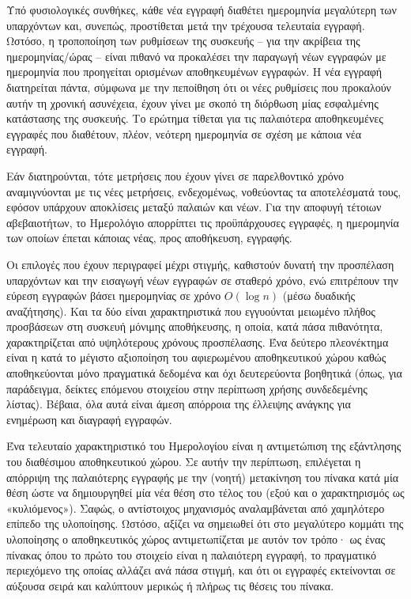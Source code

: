 Υπό φυσιολογικές συνθήκες, κάθε νέα εγγραφή διαθέτει ημερομηνία μεγαλύτερη των
υπαρχόντων και, συνεπώς, προστίθεται μετά την τρέχουσα τελευταία εγγραφή.
Ωστόσο, η τροποποίηση των ρυθμίσεων της συσκευής -- για την ακρίβεια της
ημερομηνίας\slash ώρας --  είναι πιθανό να προκαλέσει την παραγωγή νέων εγγραφών
με ημερομηνία που προηγείται ορισμένων αποθηκευμένων εγγραφών. Η νέα εγγραφή
διατηρείται πάντα, σύμφωνα με την πεποίθηση ότι οι νέες ρυθμίσεις που προκαλούν
αυτήν τη χρονική ασυνέχεια, έχουν γίνει με σκοπό τη διόρθωση μίας εσφαλμένης
κατάστασης της συσκευής. Το ερώτημα τίθεται για τις παλαιότερα αποθηκευμένες
εγγραφές που διαθέτουν, πλέον, νεότερη ημερομηνία σε σχέση με κάποια νέα
εγγραφή.

Εάν διατηρούνται, τότε μετρήσεις που έχουν γίνει σε παρελθοντικό χρόνο
αναμιγνύονται με τις νέες μετρήσεις, ενδεχομένως, νοθεύοντας τα αποτελέσματά
τους, εφόσον υπάρχουν αποκλίσεις μεταξύ παλαιών και νέων. Για την αποφυγή
τέτοιων αβεβαιοτήτων, το Ημερολόγιο απορρίπτει τις προϋπάρχουσες εγγραφές, η
ημερομηνία των οποίων έπεται κάποιας νέας, προς αποθήκευση, εγγραφής.

Οι επιλογές που έχουν περιγραφεί μέχρι στιγμής, καθιστούν δυνατή την προσπέλαση
υπαρχόντων και την εισαγωγή νέων εγγραφών σε σταθερό χρόνο, ενώ επιτρέπουν την
εύρεση εγγραφών βάσει ημερομηνίας σε χρόνο $O(\log n)$ (μέσω δυαδικής
αναζήτησης). Και τα δύο είναι χαρακτηριστικά που εγγυούνται μειωμένο πλήθος
προσβάσεων στη συσκευή μόνιμης αποθήκευσης, η οποία, κατά πάσα πιθανότητα,
χαρακτηρίζεται από υψηλότερους χρόνους προσπέλασης. Ένα δεύτερο πλεονέκτημα
είναι η κατά το μέγιστο αξιοποίηση του αφιερωμένου αποθηκευτικού χώρου καθώς
αποθηκεύονται μόνο πραγματικά δεδομένα και όχι δευτερεύοντα βοηθητικά (όπως, για
παράδειγμα, δείκτες επόμενου στοιχείου στην περίπτωση χρήσης συνδεδεμένης
λίστας).
Βέβαια, όλα αυτά είναι άμεση απόρροια της
έλλειψης ανάγκης για ενημέρωση και διαγραφή εγγραφών.

Ένα τελευταίο χαρακτηριστικό του Ημερολογίου είναι η αντιμετώπιση της εξάντλησης
του διαθέσιμου αποθηκευτικού χώρου. Σε αυτήν την περίπτωση, επιλέγεται η
απόρριψη της παλαιότερης εγγραφής με την (νοητή) μετακίνηση του πίνακα κατά μία
θέση ώστε να δημιουργηθεί μία νέα θέση στο τέλος του (εξού και ο χαρακτηρισμός
ως «κυλιόμενος»). Σαφώς, ο αντίστοιχος μηχανισμός αναλαμβάνεται από χαμηλότερο
επίπεδο της υλοποίησης. Ωστόσο, αξίζει να σημειωθεί ότι στο μεγαλύτερο κομμάτι
της υλοποίησης ο αποθηκευτικός χώρος αντιμετωπίζεται με αυτόν τον τρόπο· ως ένας
πίνακας όπου το πρώτο του στοιχείο είναι η παλαιότερη εγγραφή, το πραγματικό
περιεχόμενο της οποίας αλλάζει ανά πάσα στιγμή, και ότι οι εγγραφές εκτείνονται
σε αύξουσα σειρά και καλύπτουν μερικώς ή πλήρως τις θέσεις του πίνακα.


